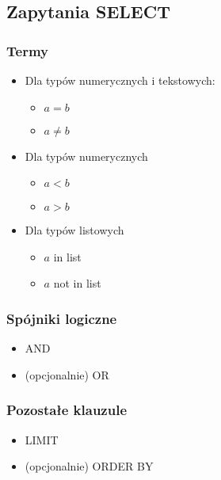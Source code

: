 \documentclass[11pt]{article}
\begin{document}
         \subsection{Zapytania SELECT}
            \subsubsection{Termy}
             \begin{itemize}
                \item Dla typów numerycznych i tekstowych:
                    \begin{itemize}
                        \item $a = b$
                        \item $a \neq b$
                    \end{itemize}
                \item Dla typów numerycznych
                    \begin{itemize}
                        \item $a < b$
                        \item $a > b$
                    \end{itemize}
                \item Dla typów listowych
                    \begin{itemize}
                        \item $a$ in list
                        \item $a$ not in list
                    \end{itemize}
            \end{itemize}
            \subsubsection{Spójniki logiczne}
            \begin{itemize}
                \item AND
                \item (opcjonalnie) OR
            \end{itemize}
            \subsubsection{Pozostałe klauzule}
            \begin{itemize}
                \item LIMIT
                \item (opcjonalnie) ORDER BY
            \end{itemize}
\end{document}
